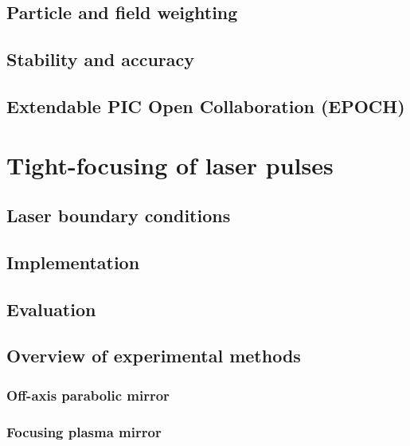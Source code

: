 \documentclass[12pt, twoside, a4paper, openright]{report}
\begin{document}
\section{Particle and field weighting}


\section{Stability and accuracy}


\section{Extendable PIC Open Collaboration (EPOCH)}



\chapter{Tight-focusing of laser pulses}


\section{Laser boundary conditions}


\section{Implementation}


\section{Evaluation}


\section{Overview of experimental methods}


\subsection{Off-axis parabolic mirror}


\subsection{Focusing plasma mirror}

\end{document}

